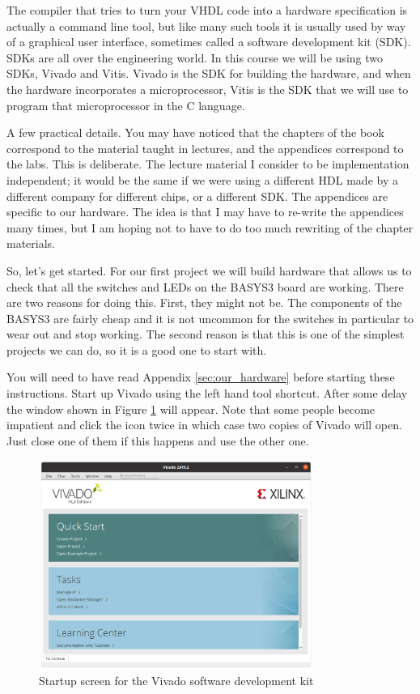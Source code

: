 \documentclass[../physical_computing.tex]{subfiles}
\begin{document}
The compiler that tries to turn your VHDL code into a hardware specification is actually a command line tool, but like many such tools it is usually used by way of a graphical user interface, sometimes called a software development kit (SDK). SDKs are all over the engineering world. In this course we will be using two SDKs, Vivado and Vitis. Vivado is the SDK for building the hardware, and when the hardware incorporates a microprocessor, Vitis is the SDK that we will use to program that microprocessor in the C language.

A few practical details. You may have noticed that the chapters of the book correspond to the material taught in lectures, and the appendices correspond to the labs. This is deliberate. The lecture material I consider to be implementation independent; it would be the same if we were using a different HDL made by a different company for different chips, or a different SDK. The appendices are specific to our hardware. The idea is that I may have to re-write the appendices many times, but I am hoping not to have to do too much rewriting of the chapter materials.

So, let's get started. For our first project we will build hardware that allows us to check that all the switches and LEDs on the BASYS3 board are working. There are two reasons for doing this. First, they might not be. The components of the BASYS3 are fairly cheap and it is not uncommon for the switches in particular to wear out and stop working. The second reason is that this is one of the simplest projects we can do, so it is a good one to start with.

You will need to have read Appendix \ref{sec:our_hardware} before starting these instructions. Start up Vivado using the left hand tool shortcut. After some delay the window shown in Figure \ref{fig:vivado_startup} will appear. Note that some people become impatient and click the icon twice in which case two copies of Vivado will open. Just close one of them if this happens and use the other one.

\begin{figure}[htbp]
    \centering
    \includegraphics[width=0.8\textwidth]{figures/vivado_startup.png}
    \caption{Startup screen for the Vivado software development kit}
    \label{fig:vivado_startup}
\end{figure}
\end{document}
